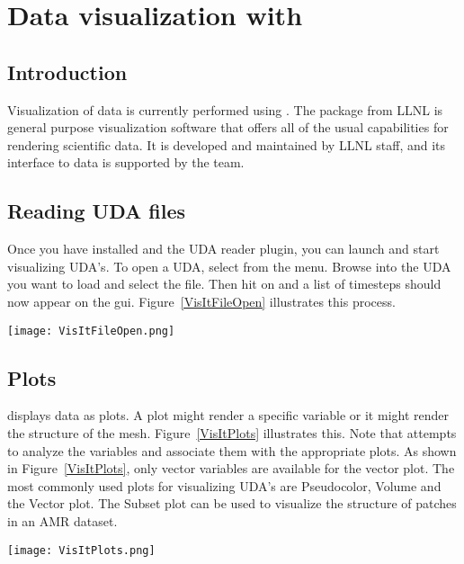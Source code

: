 \chapter{Data visualization with \Visit}
\begin{minipage}[b]{\textwidth}
  \begin{minipage}[b]{0.6\textwidth}
  \section{Introduction}
  Visualization of \Vaango data is currently performed using \Visit. 
  The \Visit package from LLNL is general purpose visualization software
  that offers all of the usual capabilities for rendering scientific
  data.  It is developed and maintained by LLNL staff, and its
   interface to \Vaango data is supported by the \Uintah team. 
  \section{Reading UDA files}
  Once you have installed \Visit and the UDA reader plugin, you can
  launch \Visit and start visualizing UDA's. To open a UDA, select  from the  menu. Browse into
  the UDA you want to load and select the 
  file. Then hit on  and a list of timesteps should
  now appear on the gui. Figure~\ref{VisItFileOpen} illustrates this
  process.
  \end{minipage}
  \hspace{12pt}
  \begin{minipage}[b]{0.35\textwidth}
    \centering
    \texttt{[image: VisItFileOpen.png]}
    \label{VisItFileOpen}
  \end{minipage}
\end{minipage}

\begin{minipage}[t]{\textwidth}
  \begin{minipage}{0.6\textwidth}
  \vspace{-48pt}
  \section{Plots}
  \Visit displays data as plots. A plot might render a specific variable
  or it might render the structure of the mesh. Figure~\ref{VisItPlots}
  illustrates this.
  Note that \Visit attempts to analyze the variables and associate them
  with the appropriate plots. As shown in Figure~\ref{VisItPlots}, only
  vector variables are available for the vector plot. The most commonly
  used plots for visualizing UDA's are Pseudocolor, Volume and the
  Vector plot. The Subset plot can be used to visualize the structure of
  patches in an AMR dataset.
  \end{minipage}
  \hspace{12pt}
  \begin{minipage}{0.35\textwidth}
    \centering
    \texttt{[image: VisItPlots.png]}
    \label{VisItPlots}
  \end{minipage}
\end{minipage}

